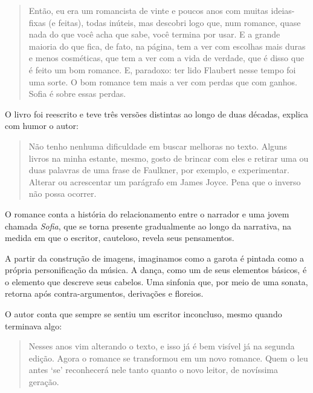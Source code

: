 \documentclass[12pt]{extarticle}
\begin{document}

\begin{quote}
Então, eu era um romancista de vinte e poucos anos com muitas ideias-fixas (e feitas), todas inúteis, mas descobri logo que, num romance, quase nada do que você acha que sabe, você termina por usar. E a grande maioria do que fica, de fato, na página, tem a ver com escolhas mais duras e menos cosméticas, que tem a ver com a vida de verdade, que é disso que é feito um bom romance. E, paradoxo: ter lido Flaubert nesse tempo foi uma sorte. O bom romance tem mais a ver com perdas que com ganhos. Sofia é sobre essas perdas. 
\end{quote}

O livro foi reescrito e teve três versões distintas ao longo de duas décadas, explica com 
humor o autor:

\begin{quote}
 Não tenho nenhuma dificuldade em buscar melhoras no texto. Alguns livros na minha estante, mesmo, gosto de brincar com eles e retirar uma ou duas palavras de uma frase de Faulkner, por exemplo, e experimentar. Alterar ou acrescentar um parágrafo em James Joyce. Pena que o inverso não possa ocorrer.
\end{quote}


O romance conta a história do relacionamento entre o narrador e uma
jovem chamada \textit{Sofia}, que se torna
presente gradualmente ao longo da narrativa, na medida em que  
o escritor, cauteloso, revela seus pensamentos.  

A partir da construção de imagens, imaginamos como a garota é pintada como a própria personificação da música. A dança, como 
um de seus elementos básicos, é o elemento que descreve seus
cabelos. Uma sinfonia que, por meio de uma
sonata, retorna após contra-argumentos, derivações e floreios.  




O autor conta que sempre se sentiu um escritor inconcluso, mesmo quando terminava algo:

\begin{quote}

Nesses anos vim alterando o texto, 
e isso já é bem visível já na segunda edição. Agora o romance 
se transformou em um novo romance. Quem o leu antes ‘se’ reconhecerá 
nele tanto quanto o novo leitor, de novíssima geração.

\end{quote}
\end{document}
